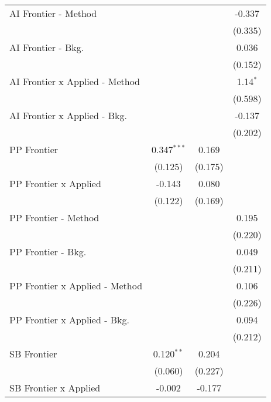 \begin{tabular}{lccc}
   AI Frontier - Method           &               &             & -0.337\\   
                                  &               &             & (0.335)\\   
   AI Frontier - Bkg.             &               &             & 0.036\\   
                                  &               &             & (0.152)\\   
   AI Frontier x Applied - Method &               &             & 1.14$^{*}$\\   
                                  &               &             & (0.598)\\   
   AI Frontier x Applied - Bkg.   &               &             & -0.137\\   
                                  &               &             & (0.202)\\   
   PP Frontier                    & 0.347$^{***}$ & 0.169       &   \\   
                                  & (0.125)       & (0.175)     &   \\   
   PP Frontier x Applied          & -0.143        & 0.080       &   \\   
                                  & (0.122)       & (0.169)     &   \\   
   PP Frontier - Method           &               &             & 0.195\\   
                                  &               &             & (0.220)\\   
   PP Frontier - Bkg.             &               &             & 0.049\\   
                                  &               &             & (0.211)\\   
   PP Frontier x Applied - Method &               &             & 0.106\\   
                                  &               &             & (0.226)\\   
   PP Frontier x Applied - Bkg.   &               &             & 0.094\\   
                                  &               &             & (0.212)\\   
   SB Frontier                    & 0.120$^{**}$  & 0.204       &   \\   
                                  & (0.060)       & (0.227)     &   \\   
   SB Frontier x Applied          & -0.002        & -0.177      &   \\   

\end{tabular}
